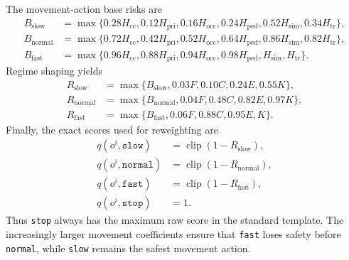 The movement-action base risks are
\[
\begin{aligned}
B_{\mathrm{slow}}&=\max\{0.28H_{\mathrm{cc}},0.12H_{\mathrm{pri}},0.16H_{\mathrm{occ}},0.24H_{\mathrm{ped}},0.52H_{\mathrm{sim}},0.34H_{\mathrm{tr}}\},\\
B_{\mathrm{normal}}&=\max\{0.72H_{\mathrm{cc}},0.42H_{\mathrm{pri}},0.52H_{\mathrm{occ}},0.64H_{\mathrm{ped}},0.86H_{\mathrm{sim}},0.82H_{\mathrm{tr}}\},\\
B_{\mathrm{fast}}&=\max\{0.96H_{\mathrm{cc}},0.88H_{\mathrm{pri}},0.94H_{\mathrm{occ}},0.98H_{\mathrm{ped}},H_{\mathrm{sim}},H_{\mathrm{tr}}\}.
\end{aligned}
\]
Regime shaping yields
\[
\begin{aligned}
R_{\mathrm{slow}}&=\max\{B_{\mathrm{slow}},0.03F,0.10C,0.24E,0.55K\},\\
R_{\mathrm{normal}}&=\max\{B_{\mathrm{normal}},0.04F,0.48C,0.82E,0.97K\},\\
R_{\mathrm{fast}}&=\max\{B_{\mathrm{fast}},0.06F,0.88C,0.95E,K\}.
\end{aligned}
\]
Finally, the exact scores used for reweighting are
\[
\begin{aligned}
q(o^i,\texttt{slow})&=\operatorname{clip}(1-R_{\mathrm{slow}}),\\
q(o^i,\texttt{normal})&=\operatorname{clip}(1-R_{\mathrm{normal}}),\\
q(o^i,\texttt{fast})&=\operatorname{clip}(1-R_{\mathrm{fast}}),\\
q(o^i,\texttt{stop})&=1.
\end{aligned}
\]
Thus \texttt{stop} always has the maximum raw score in the standard template. The increasingly larger movement coefficients ensure that \texttt{fast} loses safety before \texttt{normal}, while \texttt{slow} remains the safest movement action.
